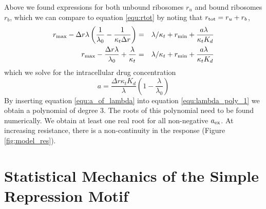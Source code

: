  Above we found expressions for both unbound ribosomes $r_u$ and bound ribosomes $r_b$, which we can compare to equation \ref{equ:rtot} by noting that $r_{\mathrm{tot}} = r_u + r_b$,
\begin{eqnarray}
    r_{\mathrm{max}} - \Delta r\lambda \left( \frac{1}{\lambda_0} - \frac{1}{\kappa_t \Delta r} \right) &=& \lambda/\kappa_t + r_{\mathrm{min}} + {a\lambda\ \over \kappa_t K_d} \nonumber\\
    r_{\mathrm{max}} - \frac{\Delta r\lambda}{\lambda_0} + \frac{\lambda}{\kappa_t }  &=& \lambda/\kappa_t + r_{\mathrm{min}} + {a\lambda\ \over \kappa_t K_d} \nonumber
\end{eqnarray}
which we solve for the intracellular drug concentration
\begin{equation}
    a = \frac{\Delta r \kappa_t K_d}{\lambda}\left( 1-\frac{\lambda}{\lambda_0} \right)\label{equ:a_of_lambda}
\end{equation}
By inserting equation \ref{equ:a_of_lambda} into equation \ref{equ:lambda_poly_1} we obtain a polynomial of degree 3. The roots of this polynomial need to be found numerically. We obtain at least one real root for all non-negative $a_{\mathrm{ex}}$. At increasing resistance, there is a non-continuity in the response (Figure \ref{fig:model_res}).


\section{Statistical Mechanics of the Simple Repression Motif}
